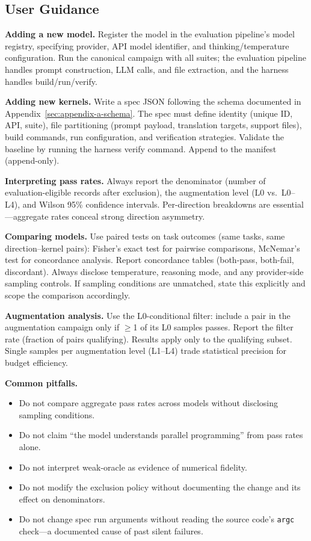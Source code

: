 \subsection{User Guidance}
\label{sec:ec-guidance}

\textbf{Adding a new model.} Register the model in the evaluation pipeline's
model registry, specifying provider, API model identifier, and
thinking/temperature configuration. Run the canonical campaign with all suites;
the evaluation pipeline handles prompt construction, LLM calls, and file
extraction, and the harness handles build/run/verify.

\textbf{Adding new kernels.} Write a spec JSON following the schema documented
in Appendix~\ref{sec:appendix-a-schema}. The spec must define identity
(unique ID, API, suite), file partitioning (prompt payload, translation targets,
support files), build commands, run configuration, and verification strategies.
Validate the baseline by running the harness verify command. Append to the
manifest (append-only).

\textbf{Interpreting pass rates.} Always report the denominator (number of
evaluation-eligible records after \knownfail{} exclusion), the augmentation level (L0 vs.\
L0--L4), and Wilson 95\% confidence intervals. Per-direction breakdowns are
essential---aggregate rates conceal strong direction asymmetry.

\textbf{Comparing models.} Use paired tests on task outcomes (same tasks, same direction--kernel pairs): Fisher's exact test for pairwise comparisons, McNemar's test for concordance analysis. Report concordance tables (both-pass, both-fail, discordant). Always disclose temperature, reasoning mode, and any provider-side sampling controls. If sampling conditions are unmatched, state this explicitly and scope the comparison accordingly.

\textbf{Augmentation analysis.} Use the L0-conditional filter: include a pair in the augmentation campaign only if $\geq$1 of its L0 samples passes. Report the filter rate (fraction of pairs qualifying). Results apply only to the qualifying subset. Single samples per augmentation level (L1--L4) trade statistical precision for budget efficiency.

\textbf{Common pitfalls.}
\begin{itemize}
  \item Do not compare aggregate pass rates across models without disclosing
    sampling conditions.
  \item Do not claim ``the model understands parallel programming'' from pass
    rates alone.
  \item Do not interpret weak-oracle \pass{} as evidence of numerical
    fidelity.
  \item Do not modify the \knownfail{} exclusion policy without documenting
    the change and its effect on denominators.
  \item Do not change spec run arguments without reading the source code's
    \texttt{argc} check---a documented cause of past silent failures.
\end{itemize}

